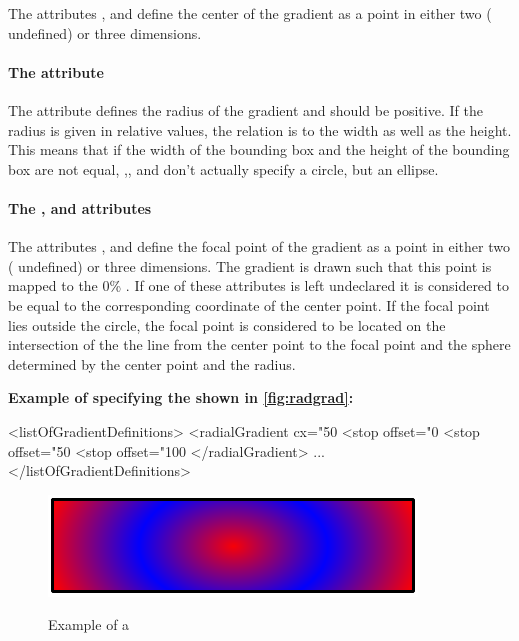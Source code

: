 The attributes ,  and  define the center of the gradient as a point in either two ( undefined) or three dimensions.


\paragraph{The \fixttspace{} attribute}

The attribute  defines the radius of the gradient and should be positive. If the radius is given in relative values, the relation is to the width as well as the height. This means that 
if the width of the bounding box and the height of the bounding box are not equal, ,,
and  don't actually specify a circle, but an ellipse.

\paragraph{The \fixttspace{}, \fixttspace{} and \fixttspace{} attributes}

The attributes ,  and  define the focal point of the gradient as a point in either two ( undefined) or three dimensions. The gradient is drawn such that this point is mapped to the 0\% \GradientStop. If one of these attributes is left undeclared it is considered to be equal to the corresponding coordinate of the center point. If the focal point lies outside 
the circle, the focal point is considered to be located on the intersection of the the line from the center
point to the focal point and the sphere determined by the center point and the radius.


  {\bf
Example of specifying the \RadialGradient shown in \ref{fig:radgrad}:
}

{\footnotesize
\begin{example}
<listOfGradientDefinitions>
  <radialGradient cx="50%
    <stop offset="0%
    <stop offset="50%
    <stop offset="100%
  </radialGradient>
       ...
</listOfGradientDefinitions>
\end{example}
}

\begin{figure}[h!]
  \centering
  \includegraphics[scale=0.5]{figures/radgrad01.pdf}\\
  \caption{Example of a \RadialGradient}
  \label{fig:lingrad}
\end{figure}



